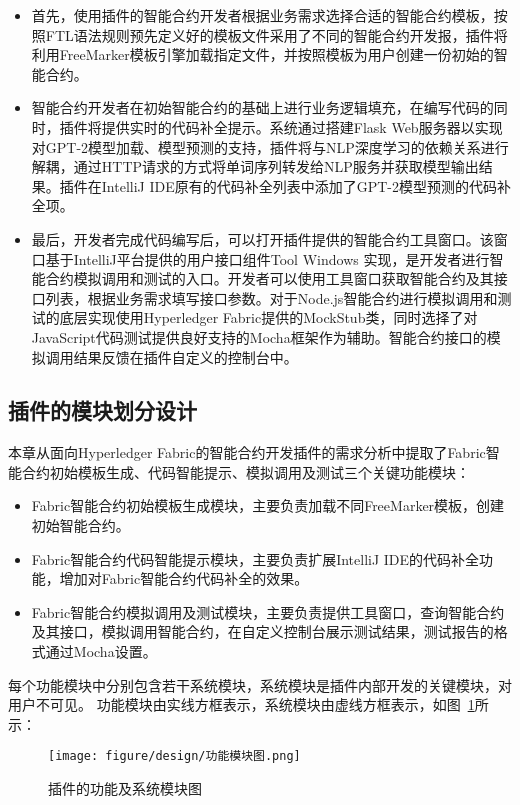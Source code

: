 \begin{itemize}
  \item 首先，使用插件的智能合约开发者根据业务需求选择合适的智能合约模板，按照FTL语法规则预先定义好的模板文件采用了不同的智能合约开发报，插件将利用FreeMarker模板引擎加载指定文件，并按照模板为用户创建一份初始的智能合约。
  \item 智能合约开发者在初始智能合约的基础上进行业务逻辑填充，在编写代码的同时，插件将提供实时的代码补全提示。系统通过搭建Flask Web服务器以实现对GPT-2模型加载、模型预测的支持，插件将与NLP深度学习的依赖关系进行解耦，通过HTTP请求的方式将单词序列转发给NLP服务并获取模型输出结果。插件在IntelliJ IDE原有的代码补全列表中添加了GPT-2模型预测的代码补全项。
  \item 最后，开发者完成代码编写后，可以打开插件提供的智能合约工具窗口。该窗口基于IntelliJ平台提供的用户接口组件Tool Windows 实现，是开发者进行智能合约模拟调用和测试的入口。开发者可以使用工具窗口获取智能合约及其接口列表，根据业务需求填写接口参数。对于Node.js智能合约进行模拟调用和测试的底层实现使用Hyperledger Fabric提供的MockStub类，同时选择了对JavaScript代码测试提供良好支持的Mocha框架作为辅助。智能合约接口的模拟调用结果反馈在插件自定义的控制台中。
\end{itemize}

\subsection{插件的模块划分设计}

本章从面向Hyperledger Fabric的智能合约开发插件的需求分析中提取了Fabric智能合约初始模板生成、代码智能提示、模拟调用及测试三个关键功能模块：

\begin{itemize}
  \item Fabric智能合约初始模板生成模块，主要负责加载不同FreeMarker模板，创建初始智能合约。
  \item Fabric智能合约代码智能提示模块，主要负责扩展IntelliJ IDE的代码补全功能，增加对Fabric智能合约代码补全的效果。
  \item Fabric智能合约模拟调用及测试模块，主要负责提供工具窗口，查询智能合约及其接口，模拟调用智能合约，在自定义控制台展示测试结果，测试报告的格式通过Mocha设置。
\end{itemize}

每个功能模块中分别包含若干系统模块，系统模块是插件内部开发的关键模块，对用户不可见。
功能模块由实线方框表示，系统模块由虚线方框表示，如图~\ref{fig:3.4}所示：

\begin{figure}[htb]
  \centering
  \texttt{[image: figure/design/功能模块图.png]}
  \caption{插件的功能及系统模块图}\label{fig:3.4}
\end{figure}

